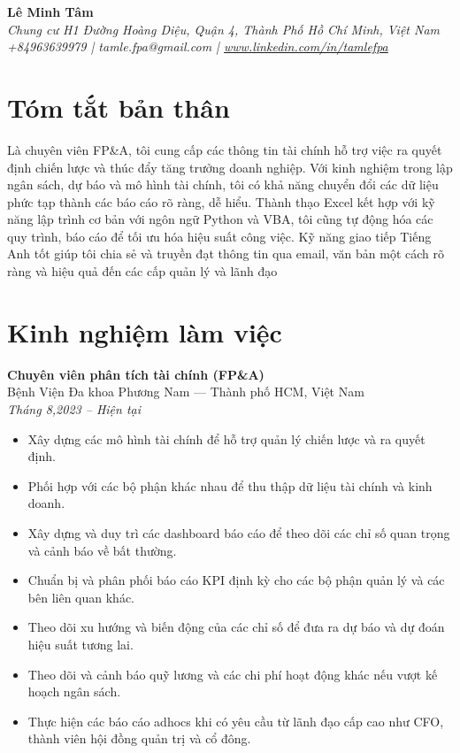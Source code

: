 \documentclass[a4paper,12pt]{article}
\newcommand{\name}[1]{\huge \textbf{#1} \\ \normalsize \medskip}
\newcommand{\contact}[1]{\normalsize \textit{#1} \\ \smallskip}
\begin{document}
\begin{center}
    \name{Lê Minh Tâm}
    \contact{
        Chung cư H1 Đường Hoàng Diệu, Quận 4, Thành Phố Hồ Chí Minh, Việt Nam \\
        +84963639979 | tamle.fpa@gmail.com | \href{www.linkedin.com/in/tamlefpa}{www.linkedin.com/in/tamlefpa} 
    }
\end{center}

\section*{Tóm tắt bản thân}
Là chuyên viên FP\&A, tôi cung cấp các thông tin tài chính hỗ trợ việc ra quyết định chiến lược và thúc đẩy tăng trưởng doanh nghiệp. Với kinh nghiệm trong lập ngân sách, dự báo và mô hình tài chính, tôi có khả năng chuyển đổi các dữ liệu phức tạp thành các báo cáo rõ ràng, dễ hiểu. Thành thạo Excel kết hợp với kỹ năng lập trình cơ bản với ngôn ngữ Python và VBA, tôi cũng tự động hóa các quy trình, báo cáo để tối ưu hóa hiệu suất công việc. Kỹ năng giao tiếp Tiếng Anh tốt giúp tôi chia sẻ và truyền đạt thông tin qua email, văn bản một cách rõ ràng và hiệu quả đến các cấp quản lý và lãnh đạo

\section*{Kinh nghiệm làm việc}

\textbf{Chuyên viên phân tích tài chính (FP\&A)} \\
Bệnh Viện Đa khoa Phương Nam — Thành phố HCM, Việt Nam \\
\textit{Tháng 8,2023 -- Hiện tại}
\begin{itemize}[leftmargin=0.5cm]
    \item Xây dựng các mô hình tài chính để hỗ trợ quản lý chiến lược và ra quyết định.
    \item Phối hợp với các bộ phận khác nhau để thu thập dữ liệu tài chính và kinh doanh.
    \item Xây dựng và duy trì các dashboard báo cáo để theo dõi các chỉ số quan trọng và cảnh báo về bất thường.
    \item Chuẩn bị và phân phối báo cáo KPI định kỳ cho các bộ phận quản lý và các bên liên quan khác.
    \item Theo dõi xu hướng và biến động của các chỉ số để đưa ra dự báo và dự đoán hiệu suất tương lai.
    \item Theo dõi và cảnh báo quỹ lương và các chi phí hoạt động khác nếu vượt kế hoạch ngân sách.
    \item Thực hiện các báo cáo adhocs khi có yêu cầu từ lãnh đạo cấp cao như CFO, thành viên hội đồng quản trị và cổ đông.
\end{itemize}
\end{document}
